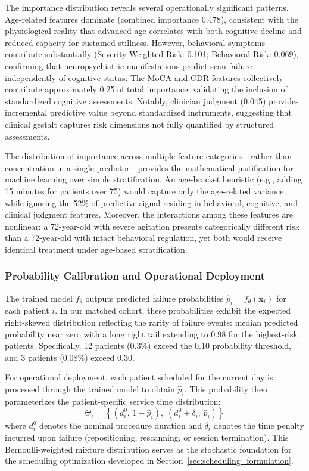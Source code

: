 The importance distribution reveals several operationally significant patterns. Age-related features dominate (combined importance 0.478), consistent with the physiological reality that advanced age correlates with both cognitive decline and reduced capacity for sustained stillness. However, behavioral symptoms contribute substantially (Severity-Weighted Risk: 0.101; Behavioral Risk: 0.069), confirming that neuropsychiatric manifestations predict scan failure independently of cognitive status. The MoCA and CDR features collectively contribute approximately 0.25 of total importance, validating the inclusion of standardized cognitive assessments. Notably, clinician judgment (0.045) provides incremental predictive value beyond standardized instruments, suggesting that clinical gestalt captures risk dimensions not fully quantified by structured assessments.

The distribution of importance across multiple feature categories---rather than concentration in a single predictor---provides the mathematical justification for machine learning over simple stratification. An age-bracket heuristic (e.g., adding 15 minutes for patients over 75) would capture only the age-related variance while ignoring the 52\% of predictive signal residing in behavioral, cognitive, and clinical judgment features. Moreover, the interactions among these features are nonlinear: a 72-year-old with severe agitation presents categorically different risk than a 72-year-old with intact behavioral regulation, yet both would receive identical treatment under age-based stratification.

\subsubsection{Probability Calibration and Operational Deployment}

The trained model $f_\theta$ outputs predicted failure probabilities $\hat{p}_i = f_\theta(\mathbf{x}_i)$ for each patient $i$. In our matched cohort, these probabilities exhibit the expected right-skewed distribution reflecting the rarity of failure events: median predicted probability near zero with a long right tail extending to 0.98 for the highest-risk patients. Specifically, 12 patients (0.3\%) exceed the 0.10 probability threshold, and 3 patients (0.08\%) exceed 0.30.

For operational deployment, each patient scheduled for the current day is processed through the trained model to obtain $\hat{p}_i$. This probability then parameterizes the patient-specific service time distribution:
\begin{equation}
\Theta_i = \left\{ \left(d_i^0,\, 1 - \hat{p}_i\right),\; \left(d_i^0 + \delta_i,\, \hat{p}_i\right) \right\}
\label{eq:bernoulli_params}
\end{equation}
where $d_i^0$ denotes the nominal procedure duration and $\delta_i$ denotes the time penalty incurred upon failure (repositioning, rescanning, or session termination). This Bernoulli-weighted mixture distribution serves as the stochastic foundation for the scheduling optimization developed in Section~\ref{sec:scheduling_formulation}.


